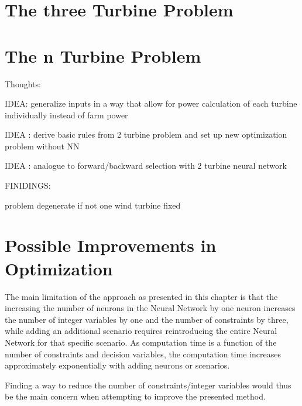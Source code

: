 \section{The three Turbine Problem}

\section{The n Turbine Problem}

Thoughts: 

IDEA: generalize inputs in a way that allow for power calculation of each turbine individually instead of farm power

IDEA : derive basic rules from 2 turbine problem and set up new optimization problem without NN 

IDEA : analogue to forward/backward selection with 2 turbine neural network


FINIDINGS: 

problem degenerate if not one wind turbine fixed

\section{Possible Improvements in Optimization}

The main limitation of the approach as presented in this chapter is that the increasing the number of neurons in the Neural Network by one neuron increases the number of integer variables by one and the number of constraints by three, while adding an additional scenario requires reintroducing the entire Neural Network for that specific scenario. As computation time is a function of the number of constraints and decision variables, the computation time increases approximately exponentially with adding neurons or scenarios. 

Finding a way to reduce the number of constraints/integer variables would thus be the main concern when attempting to improve the presented method. 
